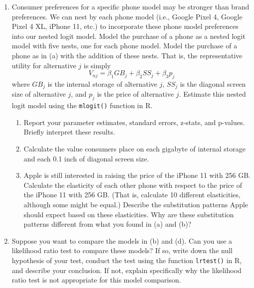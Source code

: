 \documentclass[11pt,letterpaper]{article}
\begin{document}
\begin{enumerate}[label=\alph*., leftmargin=*]
	\item Consumer preferences for a specific phone model may be stronger than brand preferences. We can nest by each phone model (i.e., Google Pixel 4, Google Pixel 4 XL, iPhone 11, etc.) to incorporate these phone model preferences into our nested logit model. Model the purchase of a phone as a nested logit model with five nests, one for each phone model. Model the purchase of a phone as in (a) with the addition of these nests. That is, the representative utility for alternative $j$ is simply
	$$V_{nj} = \beta_1 GB_j + \beta_2 SS_j + \beta_3 p_j$$
	where $GB_j$ is the internal storage of alternative $j$, $SS_j$ is the diagonal screen size of alternative $j$, and $p_j$ is the price of alternative $j$. Estimate this nested logit model using the \texttt{mlogit()} function in R. 
	\begin{enumerate}[label=\roman*.]
		\item Report your parameter estimates, standard errors, z-stats, and p-values. Briefly interpret these results. 
		\item Calculate the value consumers place on each gigabyte of internal storage and each 0.1 inch of diagonal screen size.
		\item Apple is still interested in raising the price of the iPhone 11 with 256 GB. Calculate the elasticity of each other phone with respect to the price of the iPhone 11 with 256 GB. (That is, calculate 10 different elasticities, although some might be equal.) Describe the substitution patterns Apple should expect based on these elasticities. Why are these substitution patterns different from what you found in (a) and (b)?
	\end{enumerate}

	\item Suppose you want to compare the models in (b) and (d). Can you use a likelihood ratio test to compare these models? If so, write down the null hypothesis of your test, conduct the test using the function \texttt{lrtest()} in R, and describe your conclusion. If not, explain specifically why the likelihood ratio test is not appropriate for this model comparison.
\end{enumerate}
\end{document}
